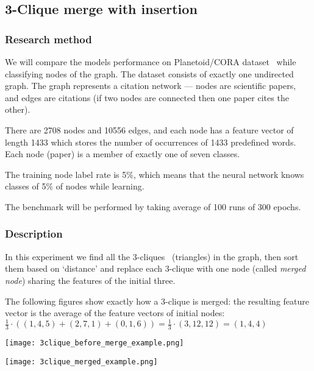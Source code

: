 \newcommand\abs[1]{\ensuremath{\lvert #1 \rvert}}

\subsection{3-Clique merge with insertion}

\subsubsection*{Research method}

We will compare the models performance on Planetoid/CORA dataset~\cite{cora_dataset} while classifying nodes of the graph.
The dataset consists of exactly one undirected graph.
The graph represents a citation network --- nodes are scientific papers, and edges are citations (if two nodes are connected then one paper cites the other).

There are 2708 nodes and 10556 edges, and each node has a feature vector of length 1433 which stores the number of occurrences of 1433 predefined words.
Each node (paper) is a member of exactly one of seven classes.

The training node label rate is 5\%, which means that the neural network knows classes of 5\% of nodes while learning.

The benchmark will be performed by taking average of 100 runs of 300 epochs.

\subsubsection*{Description}

In this experiment we find all the 3-cliques~\cite{wiki_clique} (triangles) in the graph, then sort them based on `distance' and replace each 3-clique with one node (called \emph{merged node}) sharing the features of the initial three.

The following figures show exactly how a 3-clique is merged: the resulting feature vector is the average of the feature vectors of initial nodes: $\frac{1}{3} \cdot \left( (1, 4, 5) + (2, 7, 1) + (0, 1, 6) \right) = \frac{1}{3} \cdot (3, 12, 12) = (1, 4, 4)$

\begin{multicols}{2}
	\begin{Figure}
		\centering
		\texttt{[image: 3clique\_before\_merge\_example.png]}
	\end{Figure}

	\begin{Figure}
		\centering
		\texttt{[image: 3clique\_merged\_example.png]}
		\captionof{figure}{Merged 3-clique}
	\end{Figure}
\end{multicols}

